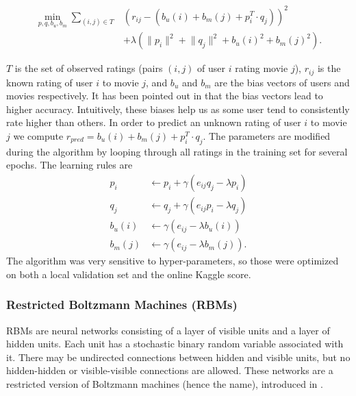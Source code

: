 \documentclass[10pt,conference,compsocconf]{IEEEtran}
\begin{document}
	\begin{equation}
	\begin{split}
	\min_{p,q,b_u,b_m} \sum_{(i,j) \in T} &(r_{ij} - (b_u(i) + b_m(j) + p_i^T \cdot q_j))^2 \\ &+ \lambda(\lVert p_i \rVert^2 + \lVert q_j \rVert^2 + b_u(i)^2 + b_m(j)^2).
	\end{split}
	\end{equation}
	
	$T$ is the set of observed ratings (pairs $(i,j)$ of user $i$ rating movie $j$), $r_{ij}$ is the known rating of user $i$ to movie $j$, and $b_u$ and $b_m$ are the bias vectors of users and movies respectively. It has been pointed out in \cite{Koren09matrixfactorization} that the bias vectors lead to higher accuracy. Intuitively, these biases help us as some user tend to consistently rate higher than others. In order to predict an unknown rating of user $i$ to movie $j$ we compute $r_{pred} = b_u(i) + b_m(j) + p_i^T\cdot q_j$.
	The parameters are modified during the algorithm by looping through all ratings in the training set for several epochs. The learning rules are
	\begin{equation}
	\begin{split}
	p_i &\leftarrow p_i + \gamma(e_{ij}q_j - \lambda p_i) \\
	q_j &\leftarrow q_j + \gamma(e_{ij}p_i - \lambda q_j) \\
	b_u(i) &\leftarrow \gamma(e_{ij} - \lambda b_u(i)) \\
	b_m(j) &\leftarrow \gamma(e_{ij} - \lambda b_m(j)).
	\end{split}
	\end{equation}
	The algorithm was very sensitive to hyper-parameters, so those were optimized on both a local validation set and the online Kaggle score.
	
	\subsubsection*{\textbf{Restricted Boltzmann Machines (RBMs)}}
	
	RBMs are neural networks consisting of a layer of visible units and a layer of hidden units. Each unit has a stochastic binary random variable associated with it. There may be undirected connections between hidden and visible units, but no hidden-hidden or visible-visible connections are allowed. These networks are a restricted version of Boltzmann machines (hence the name), introduced in \cite{AHS85}.
	
\end{document}
